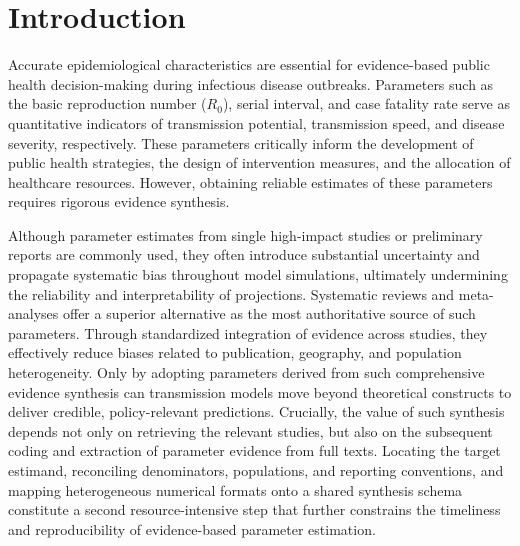 \section{Introduction}

Accurate epidemiological characteristics are essential for evidence-based public health decision-making during infectious disease outbreaks.\cite{ref1,ref2,ref3,ref4} Parameters such as the basic reproduction number ($R_0$), serial interval, and case fatality rate serve as quantitative indicators of transmission potential, transmission speed, and disease severity, respectively. These parameters critically inform the development of public health strategies, the design of intervention measures, and the allocation of healthcare resources. However, obtaining reliable estimates of these parameters requires rigorous evidence synthesis.

Although parameter estimates from single high-impact studies or preliminary reports are commonly used, they often introduce substantial uncertainty and propagate systematic bias throughout model simulations, ultimately undermining the reliability and interpretability of projections. Systematic reviews and meta-analyses offer a superior alternative as the most authoritative source of such parameters. Through standardized integration of evidence across studies, they effectively reduce biases related to publication, geography, and population heterogeneity.\cite{ref5,ref6} Only by adopting parameters derived from such comprehensive evidence synthesis can transmission models move beyond theoretical constructs to deliver credible, policy-relevant predictions. Crucially, the value of such synthesis depends not only on retrieving the relevant studies, but also on the subsequent coding and extraction of parameter evidence from full texts. Locating the target estimand, reconciling denominators, populations, and reporting conventions, and mapping heterogeneous numerical formats onto a shared synthesis schema constitute a second resource-intensive step that further constrains the timeliness and reproducibility of evidence-based parameter estimation.

